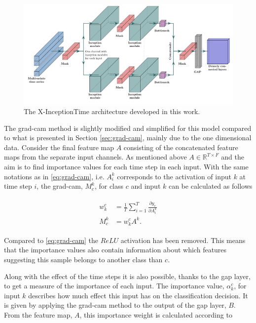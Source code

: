 \begin{figure}
  \centering
  \includegraphics[width=\textwidth]{files/figs/met/x-inception-w-masks.pdf}
  \caption{The X-InceptionTime architecture developed in this work.}
  \label{fig:x-inception}
\end{figure}

The \gls{grad-cam} method is slightly modified and simplified for this model compared to what is presented in Section \ref{sec:grad-cam}, mainly due to the one dimensional data. Consider the final feature map $A$ consisting of the concatenated feature maps from the separate input channels. As mentioned above $A \in \mathbb{R}^{T \times F}$ and the aim is to find importance values for each time step in each input. With the same notations as in \eqref{eq:grad-cam}, i.e. $A_i^k$ corresponds to the activation of input $k$ at time step $i$, the \gls{grad-cam}, $M_c^k$, for class $c$ and input $k$ can be calculated as follows

\begin{align}
    \begin{split}
        w_k^c &= \frac{1}{T}\sum_{i=1}^T \frac{\partial y_c}{\partial A_i^k} \\
        M_c^k &= w_k^c A^k.
    \end{split}
    \label{eq:grad-cam-x}
\end{align}

 Compared to \eqref{eq:grad-cam} the $ReLU$ activation has been removed. This means that the importance values also contain information about which features suggesting this sample belongs to another class than $c$.

 Along with the effect of the time steps it is also possible, thanks to the \gls{gap} layer, to get a measure of the importance of each input. The importance value, $\alpha_k^c$, for input $k$ describes how much effect this input has on the classification decision. It is given by applying the \gls{grad-cam} method to the output of the \gls{gap} layer, $B$. From the feature map, $A$, this importance weight is calculated according to

